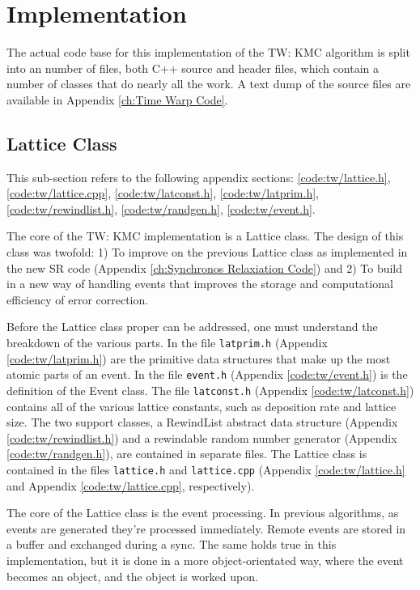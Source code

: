 \section{Implementation}

The actual code base for this implementation of the TW: KMC algorithm is split into an number of files, both C++ source and header files, which contain a number of classes that do nearly all the work.  A text dump of the source files are available in Appendix \ref{ch:Time Warp Code}.

\subsection{Lattice Class}

This sub-section refers to the following appendix sections: \ref{code:tw/lattice.h}, \ref{code:tw/lattice.cpp}, \ref{code:tw/latconst.h}, \ref{code:tw/latprim.h}, \ref{code:tw/rewindlist.h}, \ref{code:tw/randgen.h}, \ref{code:tw/event.h}.

The core of the TW: KMC implementation is a Lattice class.  The design of this class was twofold:  1) To improve on the previous Lattice class as implemented in the new SR code (Appendix \ref{ch:Synchronos Relaxiation Code}) and 2) To build in a new way of handling events that improves the storage and computational efficiency of error correction.

Before the Lattice class proper can be addressed, one must understand the breakdown of the various parts.  In the file \texttt{latprim.h} (Appendix \ref{code:tw/latprim.h}) are the primitive data structures that make up the most atomic parts of an event.  In the file \texttt{event.h} (Appendix \ref{code:tw/event.h}) is the definition of the Event class.  The file \texttt{latconst.h} (Appendix \ref{code:tw/latconst.h}) contains all of the various lattice constants, such as deposition rate and lattice size.  The two support classes, a RewindList abstract data structure (Appendix \ref{code:tw/rewindlist.h}) and a rewindable random number generator (Appendix \ref{code:tw/randgen.h}), are contained in separate files.  The Lattice class is contained in the files \texttt{lattice.h} and \texttt{lattice.cpp} (Appendix \ref{code:tw/lattice.h} and Appendix \ref{code:tw/lattice.cpp}, respectively).

The core of the Lattice class is the event processing.  In previous algorithms, as events are generated they're processed immediately.  Remote events are stored in a buffer and exchanged during a sync.  The same holds true in this implementation, but it is done in a more object-orientated way, where the event becomes an object, and the object is worked upon.


